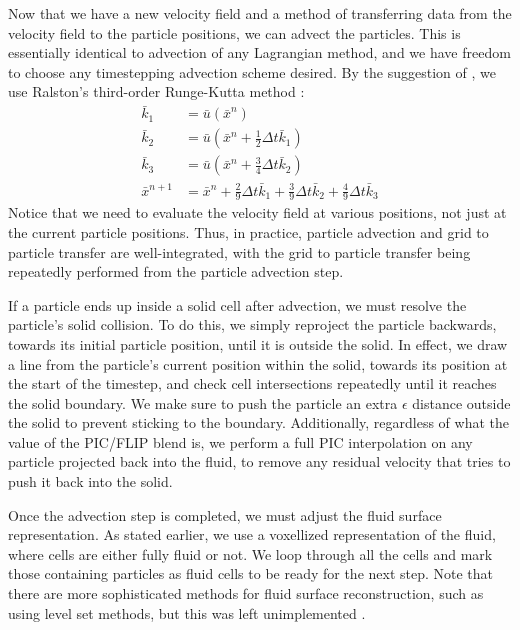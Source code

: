 \documentclass[sigconf]{acmart}
\begin{document}
Now that we have a new velocity field and a method of transferring data from the velocity field to the particle positions, we can advect the particles. This is essentially identical to advection of any Lagrangian method, and we have freedom to choose any timestepping advection scheme desired. By the suggestion of \cite{bridson2015}, we use Ralston's third-order Runge-Kutta method \cite{ralston1962}:
\begin{align}
  \bar{k}_1 &= \bar{u}(\bar{x}^n) \\
  \bar{k}_2 &= \bar{u}(\bar{x}^n + \frac{1}{2}\Delta{}t\bar{k}_1) \\
  \bar{k}_3 &= \bar{u}(\bar{x}^n + \frac{3}{4}\Delta{}t\bar{k}_2) \\
  \bar{x}^{n+1} &= \bar{x}^n + \frac{2}{9}\Delta{}t\bar{k}_1 + \frac{3}{9}\Delta{}t\bar{k}_2 + \frac{4}{9}\Delta{}t\bar{k}_3
\end{align}
Notice that we need to evaluate the velocity field at various positions, not just at the current particle positions. Thus, in practice, particle advection and grid to particle transfer are well-integrated, with the grid to particle transfer being repeatedly performed from the particle advection step.

If a particle ends up inside a solid cell after advection, we must resolve the particle's solid collision. To do this, we simply reproject the particle backwards, towards its initial particle position, until it is outside the solid. In effect, we draw a line from the particle's current position within the solid, towards its position at the start of the timestep, and check cell intersections repeatedly until it reaches the solid boundary. We make sure to push the particle an extra $\epsilon$ distance outside the solid to prevent sticking to the boundary. Additionally, regardless of what the value of the PIC/FLIP blend is, we perform a full PIC interpolation on any particle projected back into the fluid, to remove any residual velocity that tries to push it back into the solid.

Once the advection step is completed, we must adjust the fluid surface representation. As stated earlier, we use a voxellized representation of the fluid, where cells are either fully fluid or not. We loop through all the cells and mark those containing particles as fluid cells to be ready for the next step. Note that there are more sophisticated methods for fluid surface reconstruction, such as using level set methods, but this was left unimplemented \cite{bridson2015}.
\end{document}
